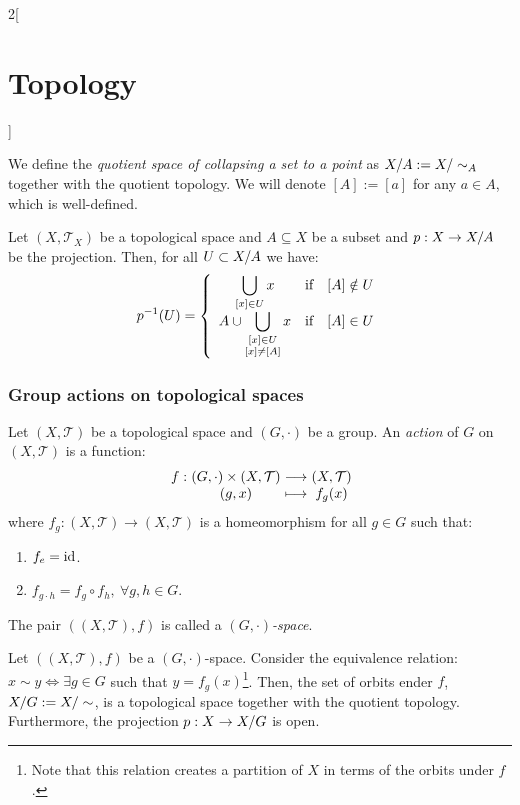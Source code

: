 \documentclass[../../../main.tex]{subfiles}
\begin{document}
\begin{multicols}{2}[\section{Topology}]
\begin{definition}
    We define the \textit{quotient space of collapsing a set to a point} as $\quot{X}{A}:=\quot{X}{\sim_A}$ together with the quotient topology. We will denote $[A]:=[a]$ for any $a\in A$, which is well-defined.
  \end{definition}
  \begin{prop}
    Let $(X,\mathcal{T}_X)$ be a topological space and $A\subseteq X$ be a subset and $p:X\rightarrow\quot{X}{A}$ be the projection. Then, for all $U\subset\quot{X}{A}$ we have:
    $$
      p^{-1}(U)=\left\{\begin{array}{ccc}
        \displaystyle\bigcup_{[x]\in U}x & \text{if} & [A]\notin U \\
        \displaystyle A\cup \bigcup_{
          \begin{subarray}{c}
            [x]\in U \\
            [x]\ne [A]
          \end{subarray}
        }x                               & \text{if} & [A]\in U
      \end{array}\right.
    $$
  \end{prop}
  \subsubsection{Group actions on topological spaces}
  \begin{definition}
    Let $(X,\mathcal{T})$ be a topological space and $(G,\cdot)$ be a group. An \textit{action} of $G$ on $(X,\mathcal{T})$ is a function:
    $$\function{f}{(G,\cdot)\times(X,\mathcal{T})}{(X,\mathcal{T})}{(g,x)}{f_g(x)}$$ where $f_g:(X,\mathcal{T})\rightarrow(X,\mathcal{T})$ is a homeomorphism for all $g\in G$ such that:
    \begin{enumerate}
      \item $f_e=\mathrm{id}$.
      \item $f_{g\cdot h}=f_g\circ f_h,\ \forall g,h\in G$.
    \end{enumerate}
    The pair $((X,\mathcal{T}),f)$ is called a \textit{$(G,\cdot)$-space}.
  \end{definition}
  \begin{prop}
    Let $((X,\mathcal{T}),f)$ be a $(G,\cdot)$-space. Consider the equivalence relation: $x\sim y\iff\exists g\in G$ such that $y=f_g(x)$\footnote{Note that this relation creates a partition of $X$ in terms of the orbits under $f$.}. Then, the set of orbits ender $f$, $\quot{X}{G}:=\quot{X}{\sim}$, is a topological space together with the quotient topology. Furthermore, the projection $p:X\rightarrow\quot{X}{G}$ is open.
  \end{prop}

\end{multicols}
\end{document}

